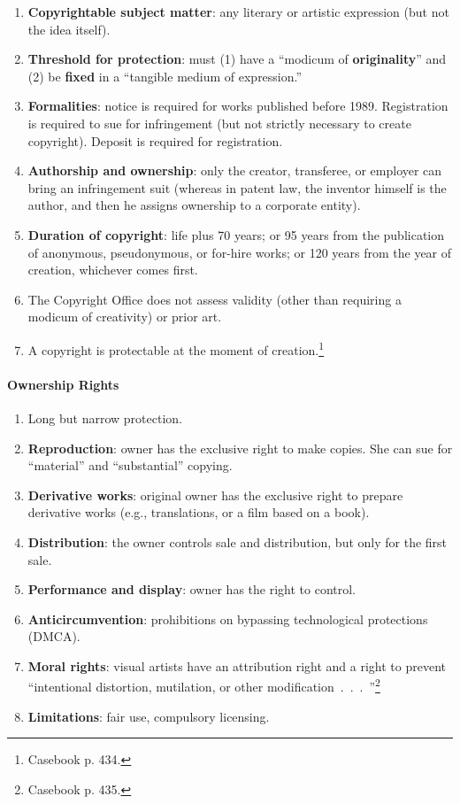 \begin{enumerate}
    \item \textbf{Copyrightable subject matter}: any literary or artistic 
    expression (but not the idea itself).
    \item \textbf{Threshold for protection}: must (1) have a ``modicum of 
    \textbf{originality}'' and (2) be \textbf{fixed} in a ``tangible medium of 
    expression.''
    \item \textbf{Formalities}: notice is required for works published before 
    1989. Registration is required to sue for infringement (but not strictly 
    necessary to create copyright). Deposit is required for registration.
    \item \textbf{Authorship and ownership}: only the creator, transferee, or 
    employer can bring an infringement suit (whereas in patent law, the 
    inventor himself is the author, and then he assigns ownership to a 
    corporate entity).
    \item \textbf{Duration of copyright}: life plus 70 years; or 95 years from 
    the publication of anonymous, pseudonymous, or for-hire works; or 120 
    years from the year of creation, whichever comes first.
    \item The Copyright Office does not assess validity (other than requiring 
    a modicum of creativity) or prior art.
    \item A copyright is protectable at the moment of 
    creation.\footnote{Casebook p. 434.}
\end{enumerate}

\paragraph{Ownership Rights}

\begin{enumerate}
    \item Long but narrow protection.
    \item \textbf{Reproduction}: owner has the exclusive right to make copies. 
    She can sue for ``material'' and ``substantial'' copying.
    \item \textbf{Derivative works}: original owner has the exclusive right to 
    prepare derivative works (e.g., translations, or a film based on a book).
    \item \textbf{Distribution}: the owner controls sale and distribution, but 
    only for the first sale.
    \item \textbf{Performance and display}: owner has the right to control.
    \item \textbf{Anticircumvention}: prohibitions on bypassing technological 
    protections (DMCA).
    \item \textbf{Moral rights}: visual artists have an attribution right and 
    a right to prevent ``intentional distortion, mutilation, or other 
    modification~.~.~.~''\footnote{Casebook p. 435.}
    \item \textbf{Limitations}: fair use, compulsory licensing.
\end{enumerate}

